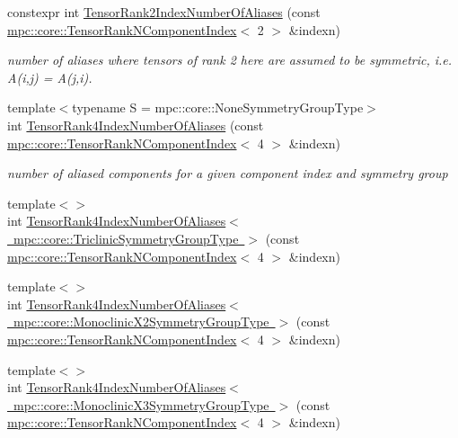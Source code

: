 \begin{DoxyCompactItemize}
\item 
constexpr int \mbox{\hyperlink{namespacempc_1_1core_a35a48d42caf0b2d1c0fe29bdfbc6a416}{Tensor\+Rank2\+Index\+Number\+Of\+Aliases}} (const \mbox{\hyperlink{classmpc_1_1core_1_1_tensor_rank_n_component_index}{mpc\+::core\+::\+Tensor\+Rank\+N\+Component\+Index}}$<$ 2 $>$ \&indexn)
\begin{DoxyCompactList}\small\item\em number of aliases where tensors of rank 2 here are assumed to be symmetric, i.\+e. A(i,j) = A(j,i). \end{DoxyCompactList}\item 
{\footnotesize template$<$typename S  = mpc\+::core\+::\+None\+Symmetry\+Group\+Type$>$ }\\int \mbox{\hyperlink{namespacempc_1_1core_a8d98ed039053b282c6ce8cff2fad214c}{Tensor\+Rank4\+Index\+Number\+Of\+Aliases}} (const \mbox{\hyperlink{classmpc_1_1core_1_1_tensor_rank_n_component_index}{mpc\+::core\+::\+Tensor\+Rank\+N\+Component\+Index}}$<$ 4 $>$ \&indexn)
\begin{DoxyCompactList}\small\item\em number of aliased components for a given component index and symmetry group \end{DoxyCompactList}\item 
{\footnotesize template$<$$>$ }\\int \mbox{\hyperlink{namespacempc_1_1core_a4b43beee70b3ec62c364455881812f4f}{Tensor\+Rank4\+Index\+Number\+Of\+Aliases$<$ mpc\+::core\+::\+Triclinic\+Symmetry\+Group\+Type $>$}} (const \mbox{\hyperlink{classmpc_1_1core_1_1_tensor_rank_n_component_index}{mpc\+::core\+::\+Tensor\+Rank\+N\+Component\+Index}}$<$ 4 $>$ \&indexn)
\item 
{\footnotesize template$<$$>$ }\\int \mbox{\hyperlink{namespacempc_1_1core_a2f0dd54326ec0f3d33bd92130c3cc9f2}{Tensor\+Rank4\+Index\+Number\+Of\+Aliases$<$ mpc\+::core\+::\+Monoclinic\+X2\+Symmetry\+Group\+Type $>$}} (const \mbox{\hyperlink{classmpc_1_1core_1_1_tensor_rank_n_component_index}{mpc\+::core\+::\+Tensor\+Rank\+N\+Component\+Index}}$<$ 4 $>$ \&indexn)
\item 
{\footnotesize template$<$$>$ }\\int \mbox{\hyperlink{namespacempc_1_1core_a4db5d7be01597c4ca1e258d2dab27e81}{Tensor\+Rank4\+Index\+Number\+Of\+Aliases$<$ mpc\+::core\+::\+Monoclinic\+X3\+Symmetry\+Group\+Type $>$}} (const \mbox{\hyperlink{classmpc_1_1core_1_1_tensor_rank_n_component_index}{mpc\+::core\+::\+Tensor\+Rank\+N\+Component\+Index}}$<$ 4 $>$ \&indexn)

\end{DoxyCompactItemize}
